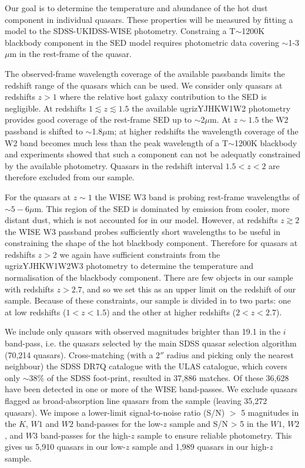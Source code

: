 Our goal is to determine the temperature and abundance of the hot dust component in individual quasars.  
These properties will be measured by fitting a model to the SDSS-UKIDSS-WISE photometry. 
Constraing a T$\sim$1200K blackbody component in the SED model requires photometric data covering $\sim$1-3$\mu$m in the rest-frame of the quasar. 

The observed-frame wavelength coverage of the available passbands limits the redshift range of the quasars which can be used. 
We consider only quasars at redshifts $z>1$ where the relative host galaxy contribution to the SED is negligible. 
At redshifts $1 \lesssim z \lesssim 1.5$ the available ugrizYJHKW1W2 photometry provides good coverage of the rest-frame SED up to $\sim$2$\mu$m.
At $z\sim1.5$ the W2 passband is shifted to $\sim$1.8$\mu$m; at higher redshifts the wavelength coverage of the W2 band becomes much less than the peak wavelength of a T$\sim$1200K blackbody and experiments showed that such a component can not be adequatly constrained by the available photometry. 
Quasars in the redshift interval $1.5 < z < 2$ are therefore excluded from our sample. 

For the quasars at $z \sim 1$ the WISE W3 band is probing rest-frame wavelengths of $\sim5-6\mu$m. 
This region of the SED is dominated by emission from cooler, more distant dust, which is not accounted for in our model.
However, at redshifts $z \gtrsim 2$ the WISE W3 passband probes sufficiently short wavelengths to be useful in constraining the shape of the hot blackbody component. 
Therefore for quasars at redshifts $z > 2$ we again have sufficient constraints from the ugrizYJHKW1W2W3 photometry to determine the temperature and normalisation of the blackbody component. 
There are few objects in our sample with redshifts $z > 2.7$, and so we set this as an upper limit on the redshift of our sample. 
Because of these constraints, our sample is divided in to two parts: one at low redshifts ($1 < z < 1.5$) and the other at higher redshifts ($2 < z < 2.7$). 

We include only quasars with observed magnitudes brighter than 19.1 in the $i$ band-pass, i.e. the quasars selected by the main SDSS quasar selection algorithm (70,214 quasars). 
Cross-matching (with a 2$''$ radius and picking only the nearest neighbour) the SDSS DR7Q catalogue with the ULAS catalogue, which covers only $\sim 38$\% of the SDSS foot-print, resulted in 37,886 matches. 
Of these 36,628 have been detected in one or more of the WISE band-passes. 
We exclude quasars flagged as broad-absorption line quasars from the sample (leaving 35,272 quasars).
We impose a lower-limit signal-to-noise ratio (S/N) $>$ 5 magnitudes in the $K$, $W1$ and $W2$ band-passes for the low-$z$ sample and S/N > 5 in the $W1$, $W2$, and $W3$ band-passes for the high-$z$ sample to ensure reliable photometry. 
This gives us 5,910 quasars in our low-$z$ sample and 1,989 quasars in our high-$z$ sample. 

